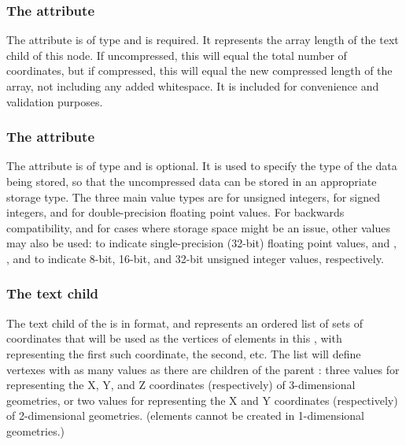 \subsubsection{The \fixttspace{} attribute}
The  attribute is of type  and is required. It represents the array length of the  text child of this node.  If uncompressed, this will equal the total number of coordinates, but if compressed, this will equal the new compressed length of the array, not including any added whitespace.  It is included for convenience and validation purposes.


\subsubsection{The \fixttspace{} attribute}
The  attribute is of type  and is optional.  It is used to specify the type of the data being stored, so that the uncompressed data can be stored in an appropriate storage type.  The three main value types are  for unsigned integers,  for signed integers, and  for double-precision floating point values.  For backwards compatibility, and for cases where storage space might be an issue, other values may also be used:  to indicate single-precision (32-bit) floating point values, and , , and  to indicate 8-bit, 16-bit, and 32-bit unsigned integer values, respectively.

\subsubsection{The \fixttspace{} text child}
\label{arraydata-class}
The  text child of the \SpatialPoints is in  format, and represents an ordered list of sets of coordinates that will be used as the vertices of \ParametricObject elements in this \ParametricGeometry, with  representing the first such coordinate,  the second, etc.  The list will define vertexes with as many values as there are \CoordinateComponent children of the parent \Geometry:  three values for representing the X, Y, and Z coordinates (respectively) of 3-dimensional geometries, or two values for representing the X and Y coordinates (respectively) of 2-dimensional geometries.  (\ParametricGeometry elements cannot be created in 1-dimensional geometries.)  

